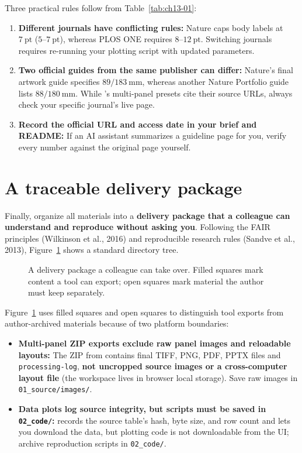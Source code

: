 Three practical rules follow from Table~\ref{tab:ch13-01}:
\begin{enumerate}
\item \textbf{Different journals have conflicting rules:} Nature caps body labels at $7\ \text{pt}$ ($5\text{--}7\ \text{pt}$), whereas PLOS ONE requires $8\text{--}12\ \text{pt}$. Switching journals requires re-running your plotting script with updated parameters.
\item \textbf{Two official guides from the same publisher can differ:} Nature's final artwork guide specifies $89 / 183\ \text{mm}$, whereas another Nature Portfolio guide lists $88 / 180\ \text{mm}$. While \scidraw{}'s multi-panel presets cite their source URLs, always check your specific journal's live page.
\item \textbf{Record the official URL and access date in your brief and README:} If an AI assistant summarizes a guideline page for you, verify every number against the original page yourself.
\end{enumerate}

\section{A traceable delivery package}

Finally, organize all materials into a \textbf{delivery package that a colleague can understand and reproduce without asking you}. Following the FAIR principles (Wilkinson et al., 2016) and reproducible research rules (Sandve et al., 2013), Figure~\ref{fig:ch13-08} shows a standard directory tree.

\begin{figure}[htbp]\centering
{\let\tag\undefined\makeatletter{}\makeatother}
\caption{A delivery package a colleague can take over. Filled squares mark content a tool can export; open squares mark material the author must keep separately.}\label{fig:ch13-08}
\end{figure}

Figure~\ref{fig:ch13-08} uses filled squares and open squares to distinguish tool exports from author-archived materials because of two platform boundaries:
\begin{itemize}
\item \textbf{Multi-panel ZIP exports exclude raw panel images and reloadable layouts:} The ZIP from  contains final TIFF, PNG, PDF, PPTX files and \texttt{processing-log}, \textbf{not uncropped source images or a cross-computer layout file} (the workspace lives in browser local storage). Save raw images in \texttt{01\_source/images/}.
\item \textbf{Data plots log source integrity, but scripts must be saved in \texttt{02\_code/}:}  records the source table's hash, byte size, and row count and lets you download the data, but plotting code is not downloadable from the UI; archive reproduction scripts in \texttt{02\_code/}.
\end{itemize}

